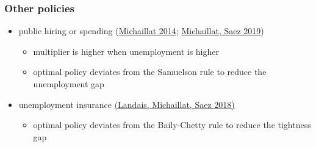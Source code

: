 \documentclass[12pt,xcolor={dvipsnames},hyperref={pdftex,pdfpagemode=UseNone,hidelinks,pdfdisplaydoctitle=true},usepdftitle=false]{beamer}
\begin{document}
\begin{frame}
\frametitle{Other policies}
\begin{itemize}
\item public hiring or spending (\href{https://www.pascalmichaillat.org/2.html}{Michaillat 2014}; \href{https://www.pascalmichaillat.org/6.html}{Michaillat, Saez 2019})
\begin{itemize}
\item multiplier is higher when unemployment is higher 
\item optimal policy deviates from the Samuelson rule to reduce the unemployment gap 
\end{itemize}
\item unemployment insurance \href{https://www.pascalmichaillat.org/4.html}{ (Landais, Michaillat, Saez 2018)}
\begin{itemize}
\item optimal policy deviates from the Baily-Chetty rule to reduce the tightness gap 
\end{itemize}
\end{itemize}	
\end{frame}
\end{document}
